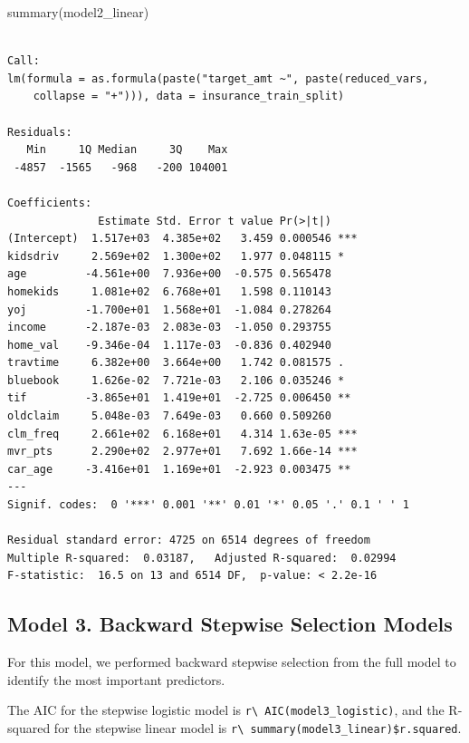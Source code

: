 \documentclass[
  11pt]{article}
\newenvironment{Shaded}{\begin{snugshade}}{\end{snugshade}}
\newcommand{\FunctionTok}[1]{\textcolor[rgb]{0.28,0.35,0.67}{#1}}
\newcommand{\NormalTok}[1]{\textcolor[rgb]{0.00,0.23,0.31}{#1}}
\begin{document}
\begin{Shaded}
\begin{Highlighting}[]
\FunctionTok{summary}\NormalTok{(model2\_linear)}
\end{Highlighting}
\end{Shaded}

\begin{verbatim}

Call:
lm(formula = as.formula(paste("target_amt ~", paste(reduced_vars, 
    collapse = "+"))), data = insurance_train_split)

Residuals:
   Min     1Q Median     3Q    Max 
 -4857  -1565   -968   -200 104001 

Coefficients:
              Estimate Std. Error t value Pr(>|t|)    
(Intercept)  1.517e+03  4.385e+02   3.459 0.000546 ***
kidsdriv     2.569e+02  1.300e+02   1.977 0.048115 *  
age         -4.561e+00  7.936e+00  -0.575 0.565478    
homekids     1.081e+02  6.768e+01   1.598 0.110143    
yoj         -1.700e+01  1.568e+01  -1.084 0.278264    
income      -2.187e-03  2.083e-03  -1.050 0.293755    
home_val    -9.346e-04  1.117e-03  -0.836 0.402940    
travtime     6.382e+00  3.664e+00   1.742 0.081575 .  
bluebook     1.626e-02  7.721e-03   2.106 0.035246 *  
tif         -3.865e+01  1.419e+01  -2.725 0.006450 ** 
oldclaim     5.048e-03  7.649e-03   0.660 0.509260    
clm_freq     2.661e+02  6.168e+01   4.314 1.63e-05 ***
mvr_pts      2.290e+02  2.977e+01   7.692 1.66e-14 ***
car_age     -3.416e+01  1.169e+01  -2.923 0.003475 ** 
---
Signif. codes:  0 '***' 0.001 '**' 0.01 '*' 0.05 '.' 0.1 ' ' 1

Residual standard error: 4725 on 6514 degrees of freedom
Multiple R-squared:  0.03187,   Adjusted R-squared:  0.02994 
F-statistic:  16.5 on 13 and 6514 DF,  p-value: < 2.2e-16
\end{verbatim}

\subsection{Model 3. Backward Stepwise Selection
Models}\label{model-3.-backward-stepwise-selection-models}

For this model, we performed backward stepwise selection from the full
model to identify the most important predictors.

The AIC for the stepwise logistic model is
\texttt{r\textbackslash{}\ AIC(model3\_logistic)}, and the R-squared for
the stepwise linear model is
\texttt{r\textbackslash{}\ summary(model3\_linear)\$r.squared}.
\end{document}
